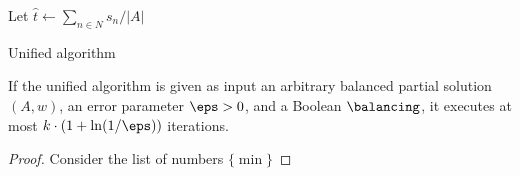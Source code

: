 \begin{algorithm}[htb]\label{alg:unified}
\SetAlgoLined
{}

Let $\hat{t}\leftarrow \sum_{n\in N} s_n / |A|$\;
\caption{Unified algorithm}
\end{algorithm}

\begin{lemma}
If the unified algorithm is given as input an arbitrary balanced partial solution $(A,w)$, an error parameter $\eps>0$, and a Boolean $\balancing$, it executes at most $k\cdot(1+\ln(1/\eps))$ iterations. 
\end{lemma}
\begin{proof}
Consider the list of numbers $\{\min\}$
\end{proof}